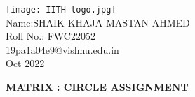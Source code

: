 \documentclass[10pt,a4paper]{report}
\begin{document}
\begin{multicols}{2}
\raggedright {\texttt{[image: IITH logo.jpg]}} \vspace{3mm}\\ \raggedleft Name:SHAIK KHAJA MASTAN AHMED\vspace{2mm}\\ 
\raggedleft Roll No.: FWC22052\vspace{2mm}\\ 
\raggedleft 19pa1a04e9@vishnu.edu.in \vspace{2mm}\\ 
\raggedleft Oct 2022 \vspace{5mm}\\
\end{multicols}

\centering \Large \textbf{MATRIX : CIRCLE ASSIGNMENT} \normalsize \vspace{10mm}
\end{document}
